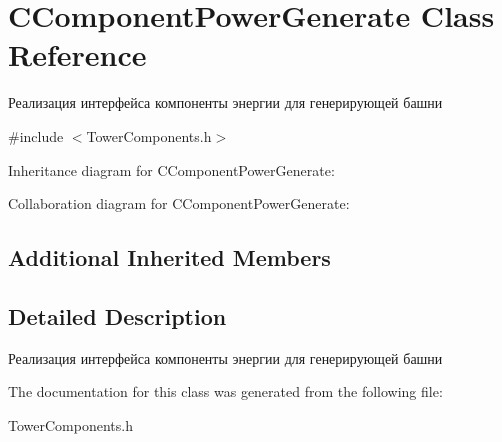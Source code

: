 \hypertarget{classCComponentPowerGenerate}{}\section{C\+Component\+Power\+Generate Class Reference}
\label{classCComponentPowerGenerate}


Реализация интерфейса компоненты энергии для генерирующей башни  




{\ttfamily \#include $<$Tower\+Components.\+h$>$}



Inheritance diagram for C\+Component\+Power\+Generate\+:


Collaboration diagram for C\+Component\+Power\+Generate\+:
\subsection*{Additional Inherited Members}


\subsection{Detailed Description}
Реализация интерфейса компоненты энергии для генерирующей башни 

The documentation for this class was generated from the following file\+:\begin{DoxyCompactItemize}
\item 
Tower\+Components.\+h\end{DoxyCompactItemize}
